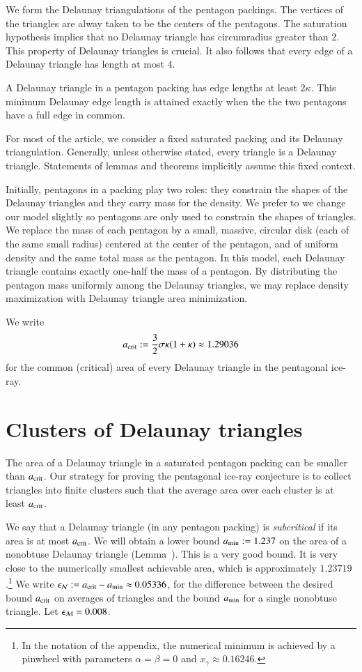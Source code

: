 We form the Delaunay triangulations of the pentagon packings.  The
vertices of the triangles are alway taken to be the centers of the
pentagons.  The saturation hypothesis implies that no Delaunay
triangle has circumradius greater than $2$.  This property of Delaunay
triangles is crucial.  It also follows that every edge of a Delaunay
triangle has length at most $4$.

A Delaunay triangle in a pentagon packing has edge lengths at least
$2\kappa$.  This minimum Delaunay edge length is attained exactly when
the the two pentagons have a full edge in common.

For most of the article, we consider a fixed saturated packing and its
Delaunay triangulation.  Generally, unless otherwise stated,
every triangle is a  Delaunay triangle.
Statements of lemmas and theorems implicitly
assume this fixed context.

Initially, pentagons in a packing play two roles: they constrain the
shapes of the Delaunay triangles and they carry mass for the density.
We prefer to we change our model slightly so pentagons are only used
to constrain the shapes of triangles.  We replace the mass of each
pentagon by a small, massive, circular disk (each of the same small
radius) centered at the center of the pentagon, and of uniform density
and the same total mass as the pentagon.  In this model, each Delaunay
triangle contains exactly one-half the mass of a pentagon.  By
distributing the pentagon mass uniformly among the Delaunay triangles,
we may replace density maximization with Delaunay triangle area
minimization.

We write 
\[
a_\text{crit} := \frac{3}{2}{ \sigma \kappa(1+\kappa)} \approx 1.29036
\] %
for the common (critical) area of every Delaunay triangle in the 
pentagonal ice-ray.

\section{Clusters of Delaunay triangles}

The area of a Delaunay triangle in a saturated pentagon packing can be
smaller than $a_\text{crit}$.  Our strategy for proving the pentagonal
ice-ray conjecture is to collect triangles into finite clusters such
that the average area over each cluster is at least $a_\text{crit}$.

We say that a Delaunay triangle (in any pentagon packing) is {\it
  subcritical} if its area is at most $a_\text{crit}$.  We will obtain a
lower bound $a_\text{min} := 1.237$ on the area of a nonobtuse Delaunay
triangle (Lemma~).  This is a very good bound.  It is
very close to the numerically smallest achievable area, which is
approximately $1.23719$.\footnote{In the notation of the appendix, the
  numerical minimum is achieved by a pinwheel with parameters
  $\alpha=\beta=0$ and $x_\gamma\approx 0.16246$.}  We write $\epsilon_{\mathcal N} :=
a_\text{crit} - a_\text{min} \approx 0.05336$, for the difference between the desired
bound $a_\text{crit}$ on averages of triangles and the bound $a_\text{min}$ for a
single nonobtuse triangle.  Let $\epsilon_{\mathcal M} = 0.008$.

